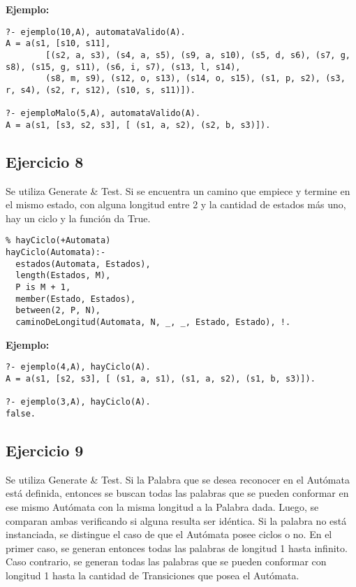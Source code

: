 \documentclass[10pt, a4paper,english,spanish,hidelinks]{article}
\begin{document}
\textbf{Ejemplo:}

\begin{verbatim}
?- ejemplo(10,A), automataValido(A).
A = a(s1, [s10, s11], 
        [(s2, a, s3), (s4, a, s5), (s9, a, s10), (s5, d, s6), (s7, g, s8), (s15, g, s11), (s6, i, s7), (s13, l, s14), 
        (s8, m, s9), (s12, o, s13), (s14, o, s15), (s1, p, s2), (s3, r, s4), (s2, r, s12), (s10, s, s11)]).

?- ejemploMalo(5,A), automataValido(A).
A = a(s1, [s3, s2, s3], [ (s1, a, s2), (s2, b, s3)]).

\end{verbatim}



\subsection{Ejercicio 8}

Se utiliza Generate \& Test.
Si se encuentra un camino que empiece y termine en el mismo estado, con alguna longitud
entre 2 y la cantidad de estados más uno, hay un ciclo y la función da True.

\begin{verbatim}
% hayCiclo(+Automata)
hayCiclo(Automata):-
  estados(Automata, Estados),
  length(Estados, M),
  P is M + 1,
  member(Estado, Estados),
  between(2, P, N),
  caminoDeLongitud(Automata, N, _, _, Estado, Estado), !.
\end{verbatim}

\textbf{Ejemplo:}
\begin{verbatim}
?- ejemplo(4,A), hayCiclo(A).
A = a(s1, [s2, s3], [ (s1, a, s1), (s1, a, s2), (s1, b, s3)]).

?- ejemplo(3,A), hayCiclo(A).
false.

\end{verbatim}


\subsection{Ejercicio 9}

Se utiliza Generate \& Test.
Si la Palabra que se desea reconocer en el Autómata está definida, entonces se buscan todas las palabras que
se pueden conformar en ese mismo Autómata con la misma longitud a la Palabra dada. Luego, se comparan ambas
verificando si alguna resulta ser idéntica. Si la palabra no está instanciada, se distingue el caso de que
el Autómata posee ciclos o no. En el primer caso, se generan entonces todas las palabras de longitud 1 hasta
infinito. Caso contrario, se generan todas las palabras que se pueden conformar con longitud 1 hasta
la cantidad de Transiciones que posea el Autómata.
\end{document}
